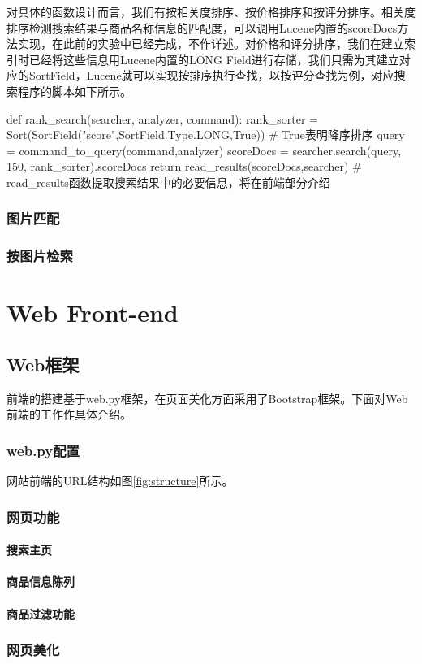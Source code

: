 对具体的函数设计而言，我们有按相关度排序、按价格排序和按评分排序。相关度排序检测搜索结果与商品名称信息的匹配度，可以调用Lucene内置的scoreDocs方法实现，在此前的实验中已经完成，不作详述。对价格和评分排序，我们在建立索引时已经将这些信息用Lucene内置的LONG Field进行存储，我们只需为其建立对应的SortField，Lucene就可以实现按排序执行查找，以按评分查找为例，对应搜索程序的脚本如下所示。

\begin{python}
def rank_search(searcher, analyzer, command):
    rank_sorter = Sort(SortField("score",SortField.Type.LONG,True))  # True表明降序排序
    query = command_to_query(command,analyzer)
    scoreDocs = searcher.search(query, 150, rank_sorter).scoreDocs
    return read_results(scoreDocs,searcher) 
    # read_results函数提取搜索结果中的必要信息，将在前端部分介绍
\end{python}

\section{图片匹配}

\section{按图片检索}


\part{Web Front-end}

\chapter{Web框架}

前端的搭建基于web.py框架，在页面美化方面采用了Bootstrap框架。下面对Web前端的工作作具体介绍。

\section{web.py配置}

网站前端的URL结构如图\ref{fig:structure}所示。

\section{网页功能}

\subsection{搜索主页}

\subsection{商品信息陈列}

\subsection{商品过滤功能}

\section{网页美化}